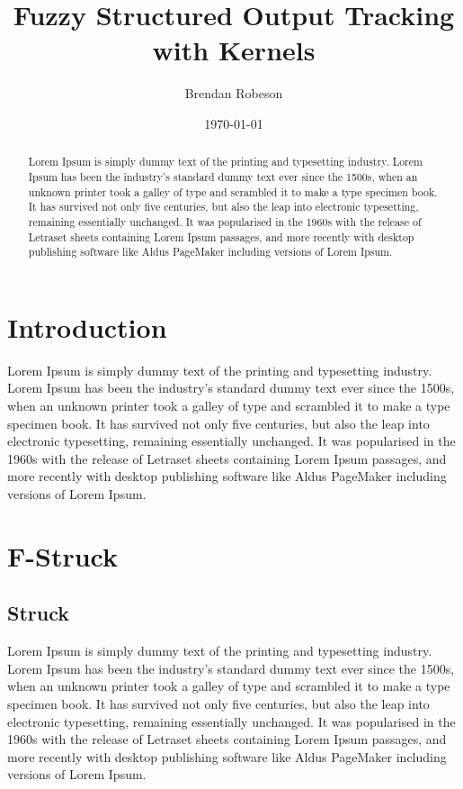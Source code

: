 \documentclass{IEEEtran}
\begin{document}
\title{Fuzzy Structured Output Tracking with Kernels}
\author{Brendan Robeson}
\date{\today}
\maketitle

\begin{abstract}
Lorem Ipsum is simply dummy text of the printing and typesetting industry. Lorem Ipsum has been the
    industry's standard dummy text ever since the 1500s, when an unknown printer took a galley of
    type and scrambled it to make a type specimen book. It has survived not only five centuries, but
    also the leap into electronic typesetting, remaining essentially unchanged. It was popularised
    in the 1960s with the release of Letraset sheets containing Lorem Ipsum passages, and more
    recently with desktop publishing software like Aldus PageMaker including versions of Lorem
    Ipsum.
\end{abstract}

\section{Introduction}
Lorem Ipsum is simply dummy text of the printing and typesetting industry. Lorem Ipsum has been the
    industry's standard dummy text ever since the 1500s, when an unknown printer took a galley of
    type and scrambled it to make a type specimen book. It has survived not only five centuries, but
    also the leap into electronic typesetting, remaining essentially unchanged. It was popularised
    in the 1960s with the release of Letraset sheets containing Lorem Ipsum passages, and more
    recently with desktop publishing software like Aldus PageMaker including versions of Lorem
    Ipsum. \cite{6126251} \cite{6671560} \cite{MIN2009147}

\section{F-Struck}
\subsection{Struck}
Lorem Ipsum is simply dummy text of the printing and typesetting industry. Lorem Ipsum has been the
    industry's standard dummy text ever since the 1500s, when an unknown printer took a galley of
    type and scrambled it to make a type specimen book. It has survived not only five centuries, but
    also the leap into electronic typesetting, remaining essentially unchanged. It was popularised
    in the 1960s with the release of Letraset sheets containing Lorem Ipsum passages, and more
    recently with desktop publishing software like Aldus PageMaker including versions of Lorem
    Ipsum.
\end{document}
